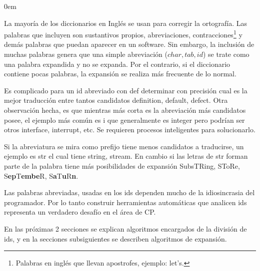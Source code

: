 \documentclass[a4paper,12pt]{report}
\begin{document}
\begin{description}
\itemsep0em%
\item[Dificultad para armar diccionarios apropiados:]  La mayoría de los diccionarios en Inglés se usan para corregir la ortografía. Las palabras que incluyen son sustantivos propios, abreviaciones, contracciones\footnote[1]{Palabras en inglés que llevan apostrofes, ejemplo: let's.} y demás palabras que puedan aparecer en un software. Sin embargo, la inclusión de muchas palabras genera que una simple abreviación ($char,tab,id$) se trate como una palabra expandida y no se expanda. Por el contrario, si el diccionario contiene pocas palabras, la expansión se realiza más frecuente de lo normal.

\item[Las abreviaciones poseen muchos candidatos a expandir:] Es complicado para un id abreviado con \textsf{def} determinar con precisión cual es la mejor traducción entre tantos candidatos \textsf{definition, default, defect}. Otra observación hecha, es que mientras más corta es la abreviación más candidatos posee, el ejemplo más común es \textsf{i} que generalmente es \textsf{integer} pero podrían ser otros \textsf{interface, interrupt}, etc. Se requieren procesos inteligentes para solucionarlo.
\pagebreak
\item[El tipo de la abreviación afecta el número de candidatos:] Si la abreviatura se mira como prefijo tiene menos candidatos a traducirse, un ejemplo es \textsf{str} el cual tiene \textsf{string, stream}. En cambio si las letras de \textsf{str} forman parte de la palabra tiene más posibilidades de expansión S\textsf{ubs}TR\textsf{ing}, ST\textsf{o}R\textsf{e}, S\textbf{ep}T\textbf{embe}R, S\textbf{a}T\textbf{u}R\textbf{n}.
\end{description}


Las palabras abreviadas, usadas en los ids dependen mucho de la idiosincrasia del programador. Por lo tanto construir herramientas automáticas que analicen ids representa un verdadero desafío en el área de CP.

En las próximas 2 secciones se explican algoritmos encargados de la división de ids, y en la secciones subsiguientes se describen algoritmos de expansión.

\end{document}
